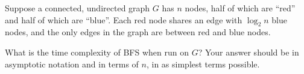 \begin{prob}
    Suppose a connected, undirected graph $G$ has $n$ nodes, half of which are
    ``red'' and half of which are ``blue''. Each red node shares an edge with
    $\log_2 n$ blue nodes, and the only edges in the graph are between red and
    blue nodes.

    What is the time complexity of BFS when run on $G$? Your answer should be in asymptotic notation
    and in terms of $n$, in as simplest terms possible.


\end{prob}
